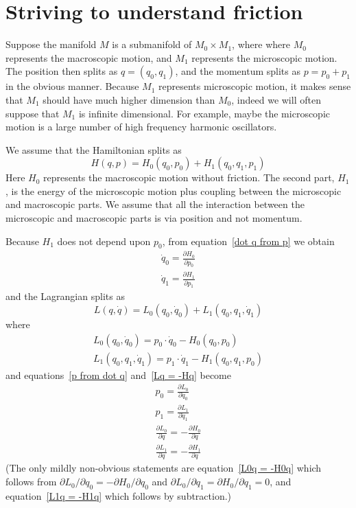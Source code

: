 \documentclass{amsart}
\begin{document}
\section{Striving to understand friction}

Suppose the manifold $M$ is a submanifold of $M_0 \times M_1$, where where $M_0$ represents the macroscopic motion, and $M_1$ represents the microscopic motion.  The position then splits as $q = (q_0,q_1)$, and the momentum splits as $p = p_0 + p_1$ in the obvious manner.  Because $M_1$ represents microscopic motion, it makes sense that $M_1$ should have much higher dimension than $M_0$, indeed we will often suppose that $M_1$ is infinite dimensional.  For example, maybe the microscopic motion is a large number of high frequency harmonic oscillators.

We assume that the Hamiltonian splits as
\begin{equation}
H(q,p) = H_0(q_0,p_0) + H_1(q_0,q_1,p_1)
\end{equation}
Here $H_0$ represents the macroscopic motion without friction.  The second part, $H_1$, is the energy of the microscopic motion plus coupling between the microscopic and macroscopic parts.  We assume that all the interaction between the microscopic and macroscopic parts is via position and not momentum.

Because $H_1$ does not depend upon $p_0$, from equation~\eqref{dot q from p} we obtain
\begin{gather}
\dot q_0 = \frac{\partial H_0}{\partial p_0} \\
\dot q_1 = \frac{\partial H_1}{\partial p_1}
\end{gather}
and the Lagrangian splits as
\begin{equation}
L(q,\dot q) = L_0(q_0,\dot q_0) + L_1(q_0,q_1,\dot q_1)
\end{equation}
where
\begin{gather}
L_0(q_0,\dot q_0) = p_0 \cdot \dot q_0 - H_0(q_0,p_0) \\
L_1(q_0,q_1,\dot q_1) = p_1 \cdot \dot q_1 - H_1(q_0,q_1,p_0)
\end{gather}
and equations~\eqref{p from dot q} and~\eqref{Lq = -Hq} become
\begin{gather}
p_0 = \frac{\partial L_0}{\partial \dot q_0} \\
p_1 = \frac{\partial L_1}{\partial \dot q_1} \\
\label{L0q = -H0q}
\frac{\partial L_0}{\partial q} = - \frac{\partial H_0}{\partial q} \\
\label{L1q = -H1q}
\frac{\partial L_1}{\partial q} = - \frac{\partial H_1}{\partial q}
\end{gather}
(The only mildly non-obvious statements are equation~\eqref{L0q = -H0q} which follows from ${\partial L_0}/{\partial q_0} = - {\partial H_0}/{\partial q_0}$ and ${\partial L_0}/{\partial q_1} = {\partial H_0}/{\partial q_1} = 0$, and equation~\eqref{L1q = -H1q} which follows by subtraction.)
\end{document}
